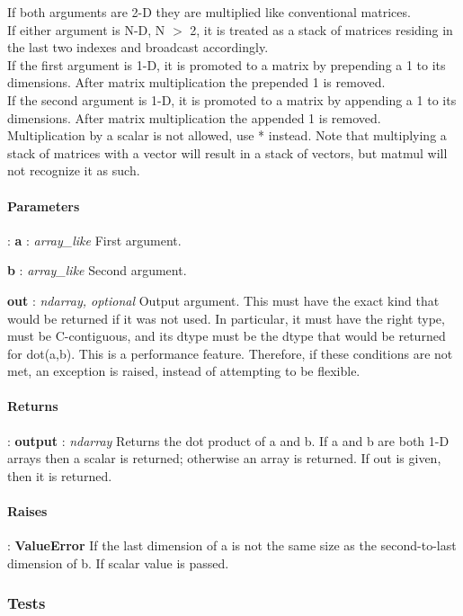 \documentclass[a4paper,11pt]{article}
\begin{document}
If both arguments are 2-D they are multiplied like conventional matrices.\\ If either argument is N-D, N $ > $ 2, it is treated as a stack of matrices residing in the last two indexes and broadcast accordingly.\\ If the first argument is 1-D, it is promoted to a matrix by prepending a 1 to its dimensions. After matrix multiplication the prepended 1 is removed.\\ If the second argument is 1-D, it is promoted to a matrix by appending a 1 to its dimensions. After matrix multiplication the appended 1 is removed.\\ Multiplication by a scalar is not allowed, use * instead. Note that multiplying a stack of matrices with a vector will result in a stack of vectors, but matmul will not recognize it as such.\\


\paragraph{Parameters}:	
\textbf{a} : \textit{array\_like} First argument.

\textbf{b} : \textit{array\_like} Second argument.

\textbf{out} : \textit{ndarray, optional} Output argument. This must have the exact kind that would be returned if it was not used. In particular, it must have the right type, must be C-contiguous, and its dtype must be the dtype that would be returned for dot(a,b). This is a performance feature. Therefore, if these conditions are not met, an exception is raised, instead of attempting to be flexible.

\paragraph{Returns}:	
\textbf{output} : \textit{ndarray} Returns the dot product of a and b. If a and b are both 1-D arrays then a scalar is returned; otherwise an array is returned. If out is given, then it is returned.

\paragraph{Raises}:	\textbf{ValueError} If the last dimension of a is not the same size as the second-to-last dimension of b. If scalar value is passed.

\subsubsection{Tests}
\end{document}
